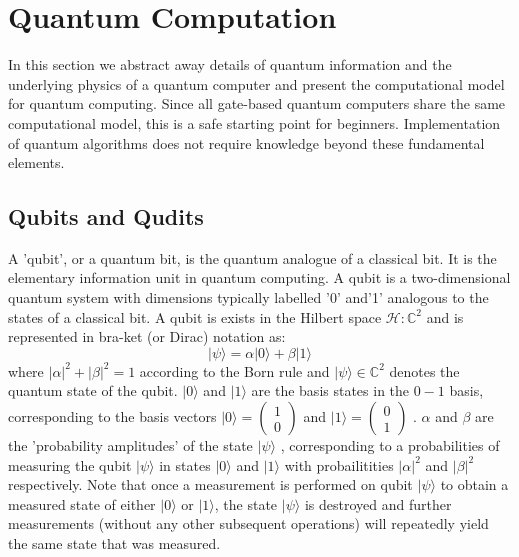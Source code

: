 \documentclass{article}
\begin{document}
\section{Quantum Computation}

In this section we abstract away details of quantum information and the underlying physics of a quantum computer and present the computational model for quantum computing. Since all gate-based quantum computers share the same computational model, this is a safe starting point for beginners. Implementation of quantum algorithms does not require knowledge beyond these fundamental elements.

\subsection{Qubits and Qudits}

A 'qubit', or a quantum bit, is the quantum analogue of a classical bit. It is the elementary information unit in quantum computing. A qubit is a two-dimensional quantum system with dimensions typically labelled '0' and'1' analogous to the states of a classical bit. A qubit is exists in the Hilbert space $ \mathcal{H} : \mathbb{C}^2$ and is represented in bra-ket (or Dirac) notation as:
\begin{equation}
\lvert \psi \rangle = \alpha \lvert 0 \rangle + \beta \lvert 1 \rangle
\end{equation}
where 
$ \lvert \alpha \rvert ^2 + \lvert \beta \rvert ^2 = 1$
 according to the Born rule and 
$ \lvert \psi \rangle \in \mathbb{C}^2$
 denotes the quantum state of the qubit. 
$ \lvert 0 \rangle$ and $ \lvert 1 \rangle $
 are the basis states in the 
$ 0-1$
 basis, corresponding to the basis vectors 
$ \lvert 0 \rangle = \begin{pmatrix}1 \\ 0\end{pmatrix} $
 and 
$ \lvert 1 \rangle = \begin{pmatrix}0 \\ 1\end{pmatrix} $
. 
$ \alpha $ and $ \beta $
 are the 'probability amplitudes' of the state 
$ \lvert \psi \rangle $
, corresponding to a probabilities of measuring the qubit $ \lvert \psi \rangle $ in states $ \lvert 0 \rangle $ and $ \lvert 1 \rangle $ with probailitities $ \lvert \alpha \rvert ^2 $ and $ \lvert \beta \rvert ^2 $ respectively. Note that once a measurement is performed on qubit $ \lvert \psi \rangle $ to obtain a measured state of either $ \lvert 0 \rangle $ or $ \lvert 1 \rangle $, the state $ \lvert \psi \rangle $ is destroyed and further measurements (without any other subsequent operations) will repeatedly yield the same state that was measured.
\end{document}
